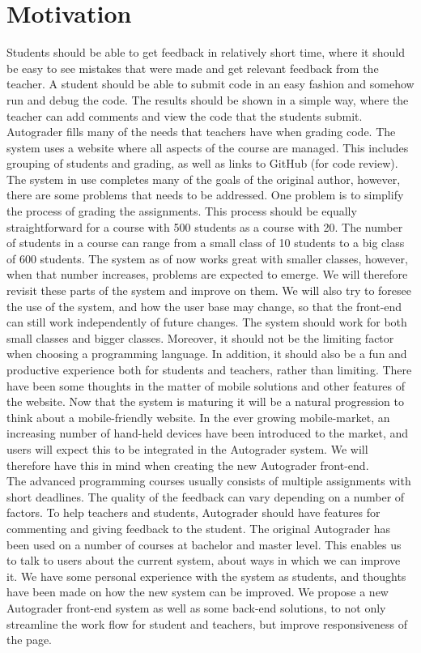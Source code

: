 \chapter*{Motivation}
Students should be able to get feedback in relatively short time, where it should be easy to see mistakes that were made and get relevant feedback from the teacher. A student should be able to submit code in an easy fashion and somehow run and debug the code. The results should be shown in a simple way, where the teacher can add comments and view the code that the students submit. Autograder fills many of the needs that teachers have when grading code. The system uses a website where all aspects of the course are managed. This includes grouping of students and grading, as well as links to GitHub (for code review). \\The system in use completes many of the goals of the original author, however, there are some problems that needs to be addressed. One problem is to simplify the process of grading the assignments. This process should be equally straightforward for a course with 500 students as a course with 20. The number of students in a course can range from a small class of 10 students to a big class of 600 students. The system as of now works great with smaller classes, however, when that number increases, problems are expected to emerge. We will therefore revisit these parts of the system and improve on them. We will also try to foresee the use of the system, and how the user base may change, so that the front-end can still work independently of future changes. The system should work for both small classes and bigger classes. Moreover, it should not be the limiting factor when choosing a programming language. In addition, it should also be a fun and productive experience both for students and teachers, rather than limiting. There have been some thoughts in the matter of mobile solutions and other features of the website. Now that the system is maturing it will be a natural progression to think about a mobile-friendly website. In the ever growing mobile-market, an increasing number of hand-held devices have been introduced to the market, and users will expect this to be integrated in the Autograder system. We will therefore have this in mind when creating the new Autograder front-end.\\The advanced programming courses usually consists of multiple assignments with short deadlines. The quality of the feedback can vary depending on a number of factors. To help teachers and students, Autograder should have features for commenting and giving feedback to the student. The original Autograder has been used on a number of courses at bachelor and master level. This enables us to talk to users about the current system, about ways in which we can improve it. We have some personal experience with the system as students, and thoughts have been made on how the new system can be improved. We propose a new Autograder front-end system as well as some back-end solutions, to not only streamline the work flow for student and teachers, but improve responsiveness of the page.